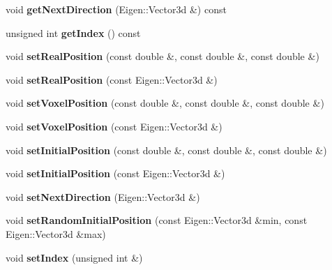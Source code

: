 \begin{DoxyCompactItemize}
\mbox{\label{class_walker_adf89d9d3c6cd537d2587e51775f9b6ad}} 
void {\bfseries get\+Next\+Direction} (Eigen\+::\+Vector3d \&) const
\item 
\mbox{\label{class_walker_a37969cac5ade61c75fb7407b56b535da}} 
unsigned int {\bfseries get\+Index} () const
\item 
\mbox{\label{class_walker_a47cb165188d588ea04f090648b091654}} 
void {\bfseries set\+Real\+Position} (const double \&, const double \&, const double \&)
\item 
\mbox{\label{class_walker_ad25cfee48c03072212d9034069002819}} 
void {\bfseries set\+Real\+Position} (const Eigen\+::\+Vector3d \&)
\item 
\mbox{\label{class_walker_a4d87112b21f490f19e7b942ca94aae20}} 
void {\bfseries set\+Voxel\+Position} (const double \&, const double \&, const double \&)
\item 
\mbox{\label{class_walker_aba1f54b57de786fe550ebfcf9f4a7e31}} 
void {\bfseries set\+Voxel\+Position} (const Eigen\+::\+Vector3d \&)
\item 
\mbox{\label{class_walker_a06a696a95f7678cb76be214e90e64337}} 
void {\bfseries set\+Initial\+Position} (const double \&, const double \&, const double \&)
\item 
\mbox{\label{class_walker_aafa361803280bc080049ea153867b61d}} 
void {\bfseries set\+Initial\+Position} (const Eigen\+::\+Vector3d \&)
\item 
\mbox{\label{class_walker_abdeb613b765c45fdabe2891accdbdfb6}} 
void {\bfseries set\+Next\+Direction} (Eigen\+::\+Vector3d \&)
\item 
\mbox{\label{class_walker_aefd71f5bc3303af7e7748bcac5b6ce92}} 
void {\bfseries set\+Random\+Initial\+Position} (const Eigen\+::\+Vector3d \&min, const Eigen\+::\+Vector3d \&max)
\item 
\mbox{\label{class_walker_aa6643451a4e13c1d7e121fe710a3bade}} 
void {\bfseries set\+Index} (unsigned int \&)

\end{DoxyCompactItemize}
